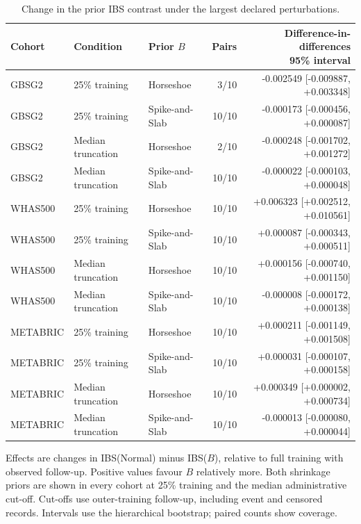 \begin{table}[p]
\centering
\footnotesize
\setlength{\tabcolsep}{3pt}
\caption{Change in the prior IBS contrast under the largest declared perturbations.}
\label{tab:report-information}
\begin{tabular}{@{}lllrr@{}}
\toprule
Cohort & Condition & Prior $B$ & Pairs & \shortstack[r]{Difference-in-differences\\95\% interval}\\
\midrule
GBSG2 & 25\% training & Horseshoe & 3/10 & -0.002549 [-0.009887, +0.003348]\\
GBSG2 & 25\% training & Spike-and-Slab & 10/10 & -0.000173 [-0.000456, +0.000087]\\
GBSG2 & Median truncation & Horseshoe & 2/10 & -0.000248 [-0.001702, +0.001272]\\
GBSG2 & Median truncation & Spike-and-Slab & 10/10 & -0.000022 [-0.000103, +0.000048]\\
WHAS500 & 25\% training & Horseshoe & 10/10 & +0.006323 [+0.002512, +0.010561]\\
WHAS500 & 25\% training & Spike-and-Slab & 10/10 & +0.000087 [-0.000343, +0.000511]\\
WHAS500 & Median truncation & Horseshoe & 10/10 & +0.000156 [-0.000740, +0.001150]\\
WHAS500 & Median truncation & Spike-and-Slab & 10/10 & -0.000008 [-0.000172, +0.000138]\\
METABRIC & 25\% training & Horseshoe & 10/10 & +0.000211 [-0.001149, +0.001508]\\
METABRIC & 25\% training & Spike-and-Slab & 10/10 & +0.000031 [-0.000107, +0.000158]\\
METABRIC & Median truncation & Horseshoe & 10/10 & +0.000349 [+0.000002, +0.000734]\\
METABRIC & Median truncation & Spike-and-Slab & 10/10 & -0.000013 [-0.000080, +0.000044]\\
\bottomrule
\end{tabular}
\par\smallskip
\begin{minipage}{\textwidth}\footnotesize Effects are changes in IBS(Normal) minus IBS($B$), relative to full training with observed follow-up. Positive values favour $B$ relatively more. Both shrinkage priors are shown in every cohort at 25\% training and the median administrative cut-off. Cut-offs use outer-training follow-up, including event and censored records. Intervals use the hierarchical bootstrap; paired counts show coverage.\end{minipage}
\end{table}
